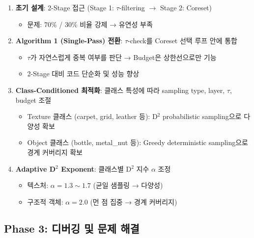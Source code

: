 \documentclass[11pt,a4paper]{article}
\begin{document}
\begin{enumerate}[leftmargin=2em]
  \item \textbf{초기 설계}: 2-Stage 접근 (Stage 1: $\tau$-filtering $\rightarrow$ Stage 2: Coreset)
  \begin{itemize}
    \item 문제: 70\% / 30\% 비율 강제 → 유연성 부족
  \end{itemize}
  \item \textbf{Algorithm 1 (Single-Pass) 전환}: $\tau$-check를 Coreset 선택 루프 안에 통합
  \begin{itemize}
    \item $\tau$가 자연스럽게 중복 여부를 판단 → Budget은 상한선으로만 기능
    \item 2-Stage 대비 코드 단순화 및 성능 향상
  \end{itemize}
  \item \textbf{Class-Conditioned 최적화}: 클래스 특성에 따라 sampling type, layer, $\tau$, budget 조절
  \begin{itemize}
    \item Texture 클래스 (carpet, grid, leather 등): D$^2$ probabilistic sampling으로 다양성 확보
    \item Object 클래스 (bottle, metal\_nut 등): Greedy deterministic sampling으로 경계 커버리지 확보
  \end{itemize}
  \item \textbf{Adaptive D$^2$ Exponent}: 클래스별 D$^2$ 지수 $\alpha$ 조정
  \begin{itemize}
    \item 텍스처: $\alpha = 1.3 \sim 1.7$ (균일 샘플링 → 다양성)
    \item 구조적 객체: $\alpha = 2.0$ (먼 점 집중 → 경계 커버리지)
  \end{itemize}
\end{enumerate}

\subsection{Phase 3: 디버깅 및 문제 해결}
\end{document}
